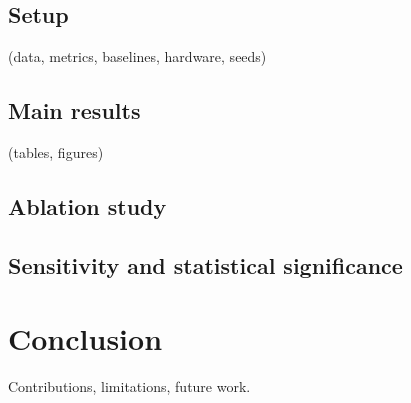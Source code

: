 \documentclass[review]{elsarticle} %
\begin{document}
    \subsection{Setup} (data, metrics, baselines, hardware, seeds)
    \subsection{Main results} (tables, figures)
    \subsection{Ablation study}
    \subsection{Sensitivity and statistical significance}

\section{Conclusion}\label{sec:conclusion}
    Contributions, limitations, future work.



\end{document}
